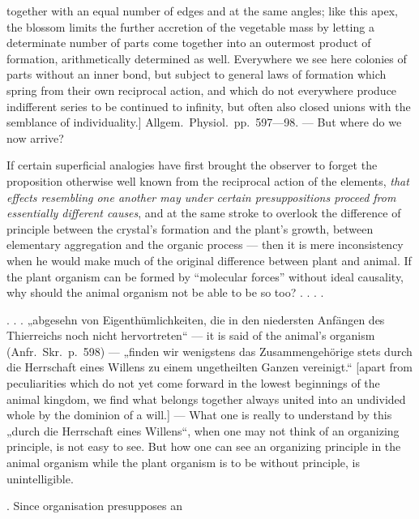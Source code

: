\documentclass[12pt,a4paper]{book}
\begin{document}
{together with an equal number of edges and at the same angles; like this apex,
the blossom limits the further accretion of the vegetable mass by letting a
determinate number of parts come together into an outermost product of
formation, arithmetically determined as well. Everywhere we see here colonies
of parts without an inner bond, but subject to general laws of formation which
spring from their own reciprocal action, and which do not everywhere produce
indifferent series to be continued to infinity, but often also closed unions
with the semblance of individuality.] Allgem.\ Physiol.\ pp.~597---98.
--- But where do we now arrive?
\par If certain superficial analogies have first brought the observer to forget
the proposition otherwise well known from the reciprocal action of the elements,
\emph{that effects resembling one another may under certain presuppositions
proceed from essentially different causes}, and at the same stroke to overlook
the difference of principle between the crystal's formation and the plant's
growth, between elementary aggregation and the organic process --- then it is
mere inconsistency when he would make much of the original difference between
plant and animal. If the plant organism can be formed by ``molecular forces''
without ideal causality, why should the animal organism not be able to be so
too? . . . .
\par . . . „abgesehn von Eigenthümlichkeiten, die in den niedersten
Anfängen des Thierreichs noch nicht hervortreten“ --- it is said of the
animal's organism (Anfr.\ Skr.\ p.~598) --- „finden wir wenigstens das
Zusammengehörige stets durch die Herrschaft eines Willens zu einem
ungetheilten Ganzen vereinigt.“ [apart from peculiarities which do not yet come
forward in the lowest beginnings of the animal kingdom, we find what belongs
together always united into an undivided whole by the dominion of a will.] ---
What one is really to understand by this „durch die Herrschaft eines Willens“,
when one may not think of an organizing principle, is not easy to see. But how
one can see an organizing principle in the animal organism while the plant
organism is to be without principle, is unintelligible.}. Since organisation presupposes an
\end{document}
